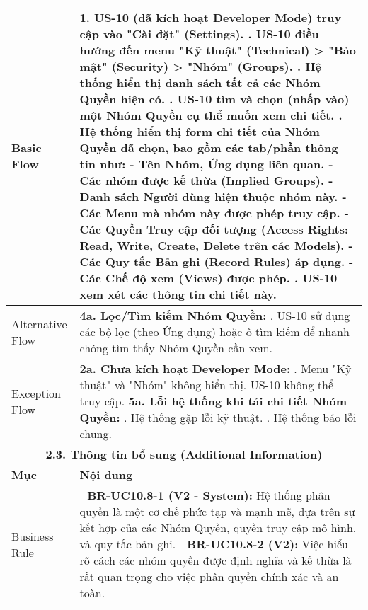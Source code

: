 \begin{longtable}{|m{4cm}|p{11cm}|}
Basic Flow & 1. US-10 (đã kích hoạt Developer Mode) truy cập vào "Cài đặt" (Settings). \newline 2. US-10 điều hướng đến menu "Kỹ thuật" (Technical) > "Bảo mật" (Security) > "Nhóm" (Groups). \newline 3. Hệ thống hiển thị danh sách tất cả các Nhóm Quyền hiện có. \newline 4. US-10 tìm và chọn (nhấp vào) một Nhóm Quyền cụ thể muốn xem chi tiết. \newline 5. Hệ thống hiển thị form chi tiết của Nhóm Quyền đã chọn, bao gồm các tab/phần thông tin như: \newline    - Tên Nhóm, Ứng dụng liên quan. \newline    - Các nhóm được kế thừa (Implied Groups). \newline    - Danh sách Người dùng hiện thuộc nhóm này. \newline    - Các Menu mà nhóm này được phép truy cập. \newline    - Các Quyền Truy cập đối tượng (Access Rights: Read, Write, Create, Delete trên các Models). \newline    - Các Quy tắc Bản ghi (Record Rules) áp dụng. \newline    - Các Chế độ xem (Views) được phép. \newline 6. US-10 xem xét các thông tin chi tiết này. \\
\hline
Alternative Flow & \textbf{4a. Lọc/Tìm kiếm Nhóm Quyền:} \newline    1. US-10 sử dụng các bộ lọc (theo Ứng dụng) hoặc ô tìm kiếm để nhanh chóng tìm thấy Nhóm Quyền cần xem. \\
\hline
Exception Flow & \textbf{2a. Chưa kích hoạt Developer Mode:} \newline    1. Menu "Kỹ thuật" và "Nhóm" không hiển thị. US-10 không thể truy cập. \newline \textbf{5a. Lỗi hệ thống khi tải chi tiết Nhóm Quyền:} \newline    1. Hệ thống gặp lỗi kỹ thuật. \newline    2. Hệ thống báo lỗi chung. \\
\hline
\multicolumn{2}{|c|}{\textbf{2.3. Thông tin bổ sung (Additional Information)}} \\
\hline
\textbf{Mục} & \textbf{Nội dung} \\
\hline
Business Rule & - \textbf{BR-UC10.8-1 (V2 - System):} Hệ thống phân quyền là một cơ chế phức tạp và mạnh mẽ, dựa trên sự kết hợp của các Nhóm Quyền, quyền truy cập mô hình, và quy tắc bản ghi. \newline - \textbf{BR-UC10.8-2 (V2):} Việc hiểu rõ cách các nhóm quyền được định nghĩa và kế thừa là rất quan trọng cho việc phân quyền chính xác và an toàn. \\

\end{longtable}
